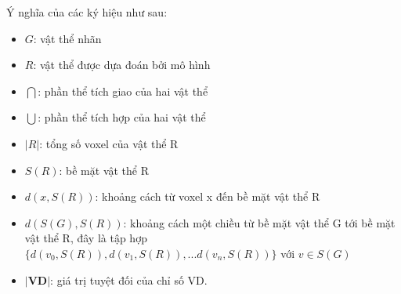 Ý nghĩa của các ký hiệu như sau:
\begin{itemize}
    \item $G$: vật thể nhãn
    \item $R$: vật thể được dựa đoán bởi mô hình
    \item $\bigcap$: phần thể tích giao của hai vật thể
    \item $\bigcup$: phần thể tích hợp của hai vật thể
    \item $|R|$: tổng số voxel của vật thể R
    \item $S(R)$: bề mặt vật thể R
    \item $d(x,S(R))$: khoảng cách từ voxel x đến bề mặt vật thể R
    \item $d(S(G),S(R))$: khoảng cách một chiều từ bề mặt vật thể G tới bề mặt vật thể R, đây là tập hợp $\{ d(v_{0}, S(R)), d(v_{1}, S(R)),...d(v_{n}, S(R)) \} $ với $v \in S(G) $
    \item $\textbf{|VD|}$: giá trị tuyệt đối của chỉ số VD.
\end{itemize}